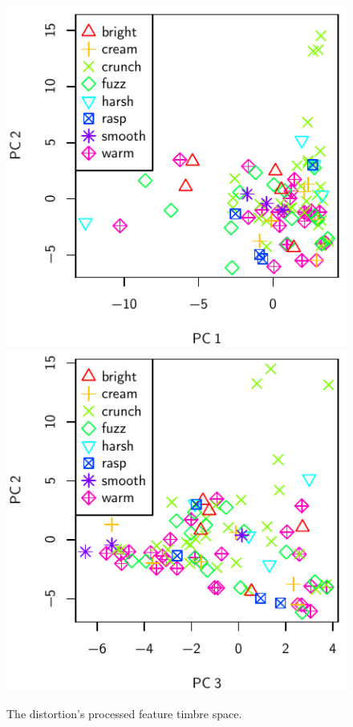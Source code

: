			\begin{figure}[h!]
				\centering
				\subfloat
				{
					\includegraphics{chapter4/Images/DistortionProcessedPCA1-2.pdf}
					\label{fig:DistortionProcessedPCA1-2}
				}
				\quad
				\subfloat
				{
					\includegraphics{chapter4/Images/DistortionProcessedPCA3-2.pdf}
					\label{fig:DistortionProcessedPCA3-2}
				}
				\caption{The distortion's processed feature timbre space.}
				\label{fig:DistortionProcessedPCAs}
			\end{figure}

